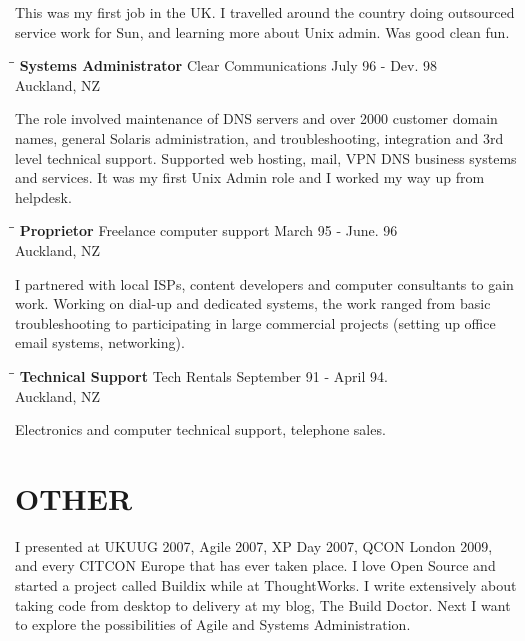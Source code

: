 \documentclass{res}
\begin{document}
\begin{resume}
	This was my first job in the UK.  I travelled around the country doing outsourced service work for Sun, and learning more about Unix admin.  Was good clean fun.
	  
	\begin{tabbing}
	   \hspace{2.3in}\= \hspace{2.6in}\= \kill %
	    {\bf Systems Administrator} \>Clear Communications \> July 96 - Dev. 98\\
	                          \>Auckland, NZ
		\end{tabbing}\vspace{-20pt}
	 The role involved maintenance of DNS servers and over 2000 customer domain names, general Solaris administration, and troubleshooting, integration and 3rd level technical support. Supported web hosting, mail, VPN DNS business systems and services. It was my first Unix Admin role and I worked my way up from helpdesk.
	
	\begin{tabbing}
	   \hspace{2.3in}\= \hspace{2.6in}\= \kill %
	    {\bf Proprietor} \>Freelance computer support \> March 95 - June. 96\\
	                          \>Auckland, NZ
	\end{tabbing}\vspace{-20pt}
	I partnered with local ISPs, content developers and computer consultants to gain work. Working on dial-up and dedicated systems, the work ranged from basic troubleshooting to participating in large commercial projects (setting up office email systems, networking).
	
	\begin{tabbing}
	   \hspace{2.3in}\= \hspace{2.6in}\= \kill %
	    {\bf Technical Support} \>Tech Rentals \> September 91 - April 94.\\
	                          \>Auckland, NZ
	\end{tabbing}\vspace{-20pt}
	Electronics and computer technical support, telephone sales.

	   
\section{OTHER}          
    I presented at UKUUG 2007, Agile 2007, XP Day 2007, QCON London 2009, and every CITCON Europe that has ever taken place.  I love Open Source and started a project called Buildix while at ThoughtWorks.  I write extensively about taking code from desktop to delivery at my blog, The Build Doctor.  Next I want to explore the possibilities of Agile and Systems Administration.
 

\end{resume}
\end{document}
